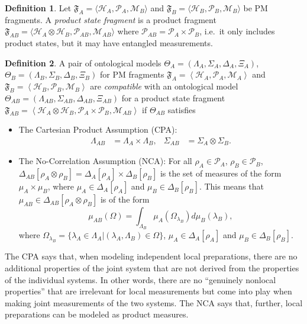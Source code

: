 \documentclass[DIV=calc,paper=a4,fontsize=11pt,twocolumn]{scrartcl} %
\theoremstyle{definition}
\newtheorem{definition}{Definition}[section]
\theoremstyle{plain}
\newcommand{\Hilb}[1][]{\ensuremath{\mathcal{H}_{#1}}}
\begin{document}
\begin{definition}
Let $\mathfrak{F}_A = \langle \Hilb[A], \mathcal{P}_A, \mathcal{M}_B
\rangle$ and $\mathfrak{F}_B = \langle \Hilb[B], \mathcal{P}_B,
\mathcal{M}_B \rangle$ be PM fragments.  A \emph{product state
fragment} is a product fragment $\mathfrak{F}_{AB} = \langle
\Hilb[A] \otimes \Hilb[B], \mathcal{P}_{AB}, \mathcal{M}_{AB}
\rangle$ where $\mathcal{P}_{AB} = \mathcal{P}_A \times
\mathcal{P}_B$, i.e.\ it only includes product states, but it may
have entangled measurements.
\end{definition}

\begin{definition}
A pair of ontological models $\Theta_A = (\Lambda_A, \Sigma_A,
\Delta_A, \Xi_A)$, $\Theta_B = (\Lambda_B, \Sigma_B, \Delta_B,
\Xi_B)$ for PM fragments $\mathfrak{F}_A = \left \langle \Hilb[A],
\mathcal{P}_A, \mathcal{M}_A \right \rangle$ and $\mathfrak{F}_B =
\left \langle \Hilb[B], \mathcal{P}_B, \mathcal{M}_B \right \rangle$
are \emph{compatible} with an ontological model $\Theta_{AB} =
(\Lambda_{AB}, \Sigma_{AB}, \Delta_{AB}, \Xi_{AB})$ for a product
state fragment $\mathfrak{F}_{AB} = \left \langle \Hilb[A] \otimes
\Hilb[B], \mathcal{P}_A \times \mathcal{P}_B, \mathcal{M}_{AB}
\right \rangle$ if $\Theta_{AB}$ satisfies
\begin{itemize}
\item The Cartesian Product Assumption (CPA):
\begin{align}
\Lambda_{AB} & = \Lambda_A \times \Lambda_B, & \Sigma_{AB} & =
\Sigma_A \otimes \Sigma_B.
\end{align}
\item The No-Correlation Assumption (NCA): For all $\rho_A \in
\mathcal{P}_A$, $\rho_B \in \mathcal{P}_B$, $\Delta_{AB}[\rho_A
\otimes \rho_B] = \Delta_A[\rho_A] \times \Delta_B[\rho_B]$ is the
set of measures of the form $\mu_A \times \mu_B$, where $\mu_A \in
\Delta_A[\rho_A]$ and $\mu_B \in \Delta_B[\rho_B]$.  This means
that $\mu_{AB} \in \Delta_{AB}[\rho_A \otimes \rho_B]$ is of the
form
\begin{equation}
\mu_{AB}(\Omega) = \int_{\Lambda_B} \mu_A(\Omega_{\lambda_B}) d
\mu_B(\lambda_B),
\end{equation}
where $\Omega_{\lambda_B} = \{\lambda_A \in \Lambda_A |
(\lambda_A,\Lambda_B) \in \Omega\}$, $\mu_A \in \Delta_A[\rho_A]$
and $\mu_B \in \Delta_B[\rho_B]$.
\end{itemize}
\end{definition}

The CPA says that, when modeling independent local preparations,
there are no additional properties of the joint system that are not
derived from the properties of the individual systems.  In other words,
there are no ``genuinely nonlocal properties'' that are irrelevant for
local measurements but come into play when making joint measurements
of the two systems.  The NCA says that, further, local preparations
can be modeled as product measures.
\end{document}
